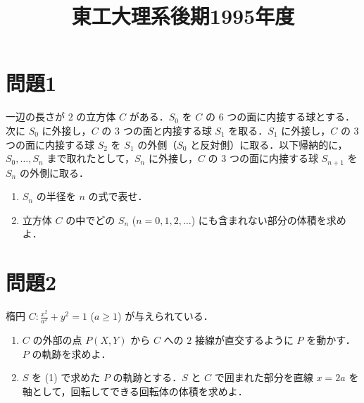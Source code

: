 \documentclass[unicode,12pt, a4paper]{ltjsarticle}%
\title{東工大理系後期1995年度}
\begin{document}
\maketitle
\section{問題1}
一辺の長さが $2$ の立方体 $C$ がある．$S_0$ を $C$ の $6$ つの面に内接する球とする．次に $S_0$ に外接し，$C$ の $3$ つの面と内接する球 $S_1$ を取る．$S_1$ に外接し，$C$ の $3$ つの面に内接する球 $S_2$ を $S_1$ の外側（$S_0$ と反対側）に取る．以下帰納的に，$S_0, \ldots, S_n$ まで取れたとして，$S_n$ に外接し，$C$ の $3$ つの面に内接する球 $S_{n+1}$ を $S_n$ の外側に取る．
    \begin{enumerate}
        \item $S_n$ の半径を $n$ の式で表せ．
        \item 立方体 $C$ の中でどの $S_n$ ($n=0,1,2,\ldots$) にも含まれない部分の体積を求めよ．
    \end{enumerate}


\section{問題2}
楕円 $C: \frac{x^2}{a^2} + y^2 = 1$ ($a \ge 1$) が与えられている．
    \begin{enumerate}
        \item $C$ の外部の点 $P(X,Y)$ から $C$ への $2$ 接線が直交するように $P$ を動かす．$P$ の軌跡を求めよ．
        \item $S$ を (1) で求めた $P$ の軌跡とする．$S$ と $C$ で囲まれた部分を直線 $x=2a$ を軸として，回転してできる回転体の体積を求めよ．
    \end{enumerate}
\end{document}
